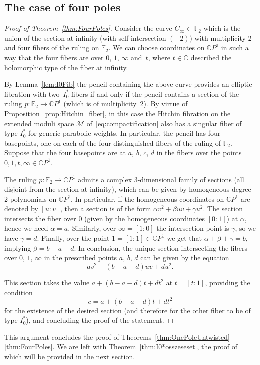 \documentclass[pdftex]{sigma}
\newcommand{\C}{{\mathbb C}} %
\newcommand{\CP}[1]{\mathbb{C}P^{#1}} %
\newcommand{\Mod}{{\mathcal M}} %
\numberwithin{equation}{section}
\begin{document}
\subsection{The case of four poles}
\begin{proof}[Proof of Theorem~\ref{thm:FourPoles}]
Consider the curve $C_{\infty}\subset {\mathbb {F}}_2$ which is the union
of the section at infinity (with self-intersection $(-2)$) with multiplicity
2 and four fibers of the ruling on ${\mathbb {F}}_2$. We can choose
coordinates on $\CP{1}$ in such a way that the four fibers are
over $0$, $1$, $\infty$ and~$t$, where $t\in \C$ described the holomorphic type
of the fiber at infinity.

By Lemma~\ref{lem:I0Fib} the pencil containing the above curve
provides an elliptic fibration with two~$I_0^*$ fibers if and only if
the pencil contains a section of the ruling $p\colon {\mathbb
 {F}}_2\to \CP{1}$ (which is of multiplicity~2).
 {By virtue of Proposition~\ref{prop:Hitchin_fiber}, in this case
 the Hitchin fibration on the extended moduli space $\overline{\Mod}$
 of~\eqref{eq:compactification} also has a singular fiber of type $I_0^*$
 for generic parabolic weights.}
 In particular, the
pencil has four basepoints, one on each of the four distinguished fibers
of the ruling of ${\mathbb {F}}_2$. Suppose that the four basepoints
are at $a$, $b$, $c$, $d$ in the fibers over the points $0,1,t,\infty \in
\CP{1}$.

The ruling $p\colon {\mathbb {F}}_2\to \CP{1}$ admits a complex
3-dimensional family of sections (all disjoint from the section at
infinity), which can be given by homogeneous degree-2 polynomials on
$\CP{1}$. In particular, if the homogeneous coordinates on $\CP{1}$
are denoted by $[u:v]$, then a section is of the form $\alpha
v^2+\beta uv+\gamma u^2$. The section intersects the fiber over $0$
(given by the homogeneous coordinates $[0:1]$) at $\alpha$,
hence we need $\alpha =a$. Similarly, over $\infty=[1:0]$
the intersection point is $\gamma$, so we have $\gamma =d$.
Finally, over the point $1=[1:1]\in \CP{1}$ we get that
$\alpha +\beta +\gamma =b$, implying $\beta =b-a-d$.
In conclusion, the unique section intersecting the
fibers over $0$, $1$, $\infty$ in the prescribed points $a$, $b$, $d$
can be given by the equation
\[
av^2+(b-a-d)uv+du^2.
\]

This section takes the value
$a+(b-a-d)t+dt^2$ at $t=[t:1]$, providing the condition
\[
c= a+(b-a-d)t+dt^2
\]
for the existence of the desired section (and therefore for the other
fiber to be of type $I_0^*$), and concluding the proof of the statement.
\end{proof}
{This argument concludes the proof of Theorems~\ref{thm:OnePoleUntwisted}--\ref{thm:FourPoles}. We are left
 with Theorem~\ref{thm:I0*osszeseset}, the proof of which will be
 provided in the next section.}
\end{document}
